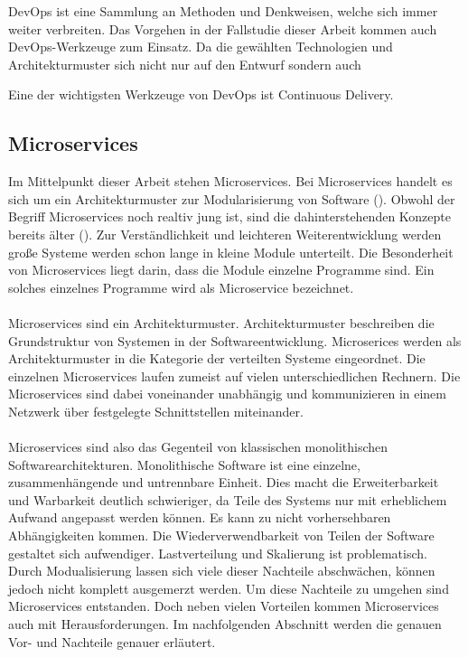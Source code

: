 DevOps ist eine Sammlung an Methoden und Denkweisen, welche sich immer weiter verbreiten. Das Vorgehen in der Fallstudie dieser Arbeit kommen auch DevOps-Werkzeuge zum Einsatz. Da die gewählten Technologien und Architekturmuster sich nicht nur auf den Entwurf sondern auch


Eine der wichtigsten Werkzeuge von DevOps ist Continuous Delivery.

\subsection{Microservices}

Im Mittelpunkt dieser Arbeit stehen Microservices. Bei Microservices handelt es sich um ein Architekturmuster zur Modularisierung von Software (\cite[S. 15]{newmanMicroservices2015}). Obwohl der Begriff Microservices noch realtiv jung ist, sind die dahinterstehenden Konzepte bereits älter (\cite[S. 15]{newmanMicroservices2015}). Zur Verständlichkeit und leichteren Weiterentwicklung werden große Systeme werden schon lange in kleine Module unterteilt. Die Besonderheit von Microservices liegt darin, dass die Module einzelne Programme sind. Ein solches einzelnes Programme wird als Microservice bezeichnet. \\
\\
Microservices sind ein Architekturmuster. Architekturmuster beschreiben die Grundstruktur von Systemen in der Softwareentwicklung. Microserices werden als Architekturmuster in die Kategorie der verteilten Systeme eingeordnet. Die einzelnen Microservices laufen zumeist auf vielen unterschiedlichen Rechnern. Die Microservices sind dabei voneinander unabhängig und kommunizieren in einem Netzwerk über festgelegte Schnittstellen miteinander. \\
\\
Microservices sind also das Gegenteil von klassischen monolithischen Softwarearchitekturen. Monolithische Software ist eine einzelne, zusammenhängende und untrennbare Einheit. Dies macht die Erweiterbarkeit und Warbarkeit deutlich schwieriger, da Teile des Systems nur mit erheblichem Aufwand angepasst werden können. Es kann zu nicht vorhersehbaren Abhängigkeiten kommen. Die Wiederverwendbarkeit von Teilen der Software gestaltet sich aufwendiger. Lastverteilung und Skalierung ist problematisch. Durch Modualisierung lassen sich viele dieser Nachteile abschwächen, können jedoch nicht komplett ausgemerzt werden. Um diese Nachteile zu umgehen sind Microservices entstanden. Doch neben vielen Vorteilen kommen Microservices auch mit Herausforderungen. Im nachfolgenden Abschnitt werden die genauen Vor- und Nachteile genauer erläutert. \\
